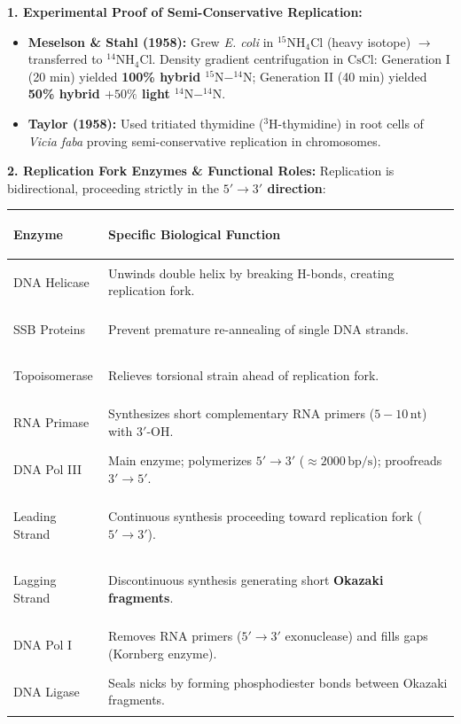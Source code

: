 \documentclass[10pt,twoside,openright]{book}
\begin{document}
\begin{formulabox}
\textbf{1. Experimental Proof of Semi-Conservative Replication:}
\begin{itemize}
  \item \textbf{Meselson \& Stahl (1958):} Grew \textit{E. coli} in $^{15}\mathrm{NH_4Cl}$ (heavy isotope) $\to$ transferred to $^{14}\mathrm{NH_4Cl}$. Density gradient centrifugation in $\mathrm{CsCl}$: Generation I (20 min) yielded \textbf{100\% hybrid $^{15}\mathrm{N}-^{14}\mathrm{N}$}; Generation II (40 min) yielded \textbf{50\% hybrid $+ 50\%$ light $^{14}\mathrm{N}-^{14}\mathrm{N}$}.
  \item \textbf{Taylor (1958):} Used tritiated thymidine ($^3\mathrm{H}$-thymidine) in root cells of \textit{Vicia faba} proving semi-conservative replication in chromosomes.
\end{itemize}

\textbf{2. Replication Fork Enzymes \& Functional Roles:}
Replication is bidirectional, proceeding strictly in the \textbf{$5'\to 3'$ direction}:
\begin{center}
\footnotesize
\setlength{\tabcolsep}{3pt}
\renewcommand{\arraystretch}{1.15}
\begin{tabularx}{\linewidth}{|>{\bfseries\raggedright\arraybackslash}p{2.2cm}|X|}
\hline
\textbf{Enzyme} & \textbf{Specific Biological Function} \\
\hline
DNA Helicase & Unwinds double helix by breaking H-bonds, creating replication fork. \\
SSB Proteins & Prevent premature re-annealing of single DNA strands. \\
Topoisomerase & Relieves torsional strain ahead of replication fork. \\
RNA Primase & Synthesizes short complementary RNA primers ($5-10\,\mathrm{nt}$) with $3'\text{-OH}$. \\
DNA Pol III & Main enzyme; polymerizes $5'\to 3'$ ($\approx 2000\,\mathrm{bp/s}$); proofreads $3'\to 5'$. \\
Leading Strand & Continuous synthesis proceeding toward replication fork ($5'\to 3'$). \\
Lagging Strand & Discontinuous synthesis generating short \textbf{Okazaki fragments}. \\
DNA Pol I & Removes RNA primers ($5'\to 3'$ exonuclease) and fills gaps (Kornberg enzyme). \\
DNA Ligase & Seals nicks by forming phosphodiester bonds between Okazaki fragments. \\
\hline
\end{tabularx}
\end{center}
\end{formulabox}
\end{document}
